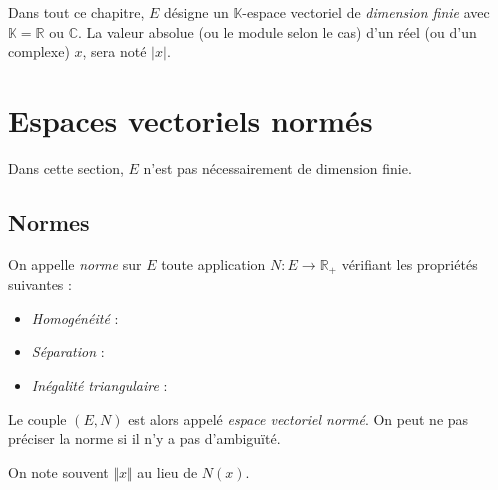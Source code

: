 \documentclass[a4paper,10pt]{report}
\begin{document}


Dans tout ce chapitre, $E$ désigne un $\mathbb{K}$-espace vectoriel de \emph{dimension finie} avec $\mathbb{K}= \mathbb{R}$ ou $\mathbb{C}$. La valeur absolue (ou le module selon le cas) d'un réel (ou d'un complexe) $x$, sera noté $\vert x \vert$.

 \section{Espaces vectoriels normés}
 
 Dans cette section, $E$ n'est pas nécessairement de dimension finie.
 
 \subsection{Normes}
 
 \begin{Definition}{} On appelle \emph{norme} sur $E$ toute application $N : E \rightarrow \mathbb{R}_+$ vérifiant les propriétés suivantes :
 
 \begin{itemize}
 \item \emph{Homogénéité} :
 
 \item \emph{Séparation} :
 
 \item \emph{Inégalité triangulaire} :
 
 \end{itemize}
 
Le couple $(E,N)$ est alors appelé \emph{espace vectoriel normé}. On peut ne pas préciser la norme si il n'y a pas d'ambiguïté.
\end{Definition}
 
 \begin{Remarque}{} On note souvent $\Vert x \Vert$ au lieu de $N(x)$.
 \end{Remarque}
 
\end{document}
